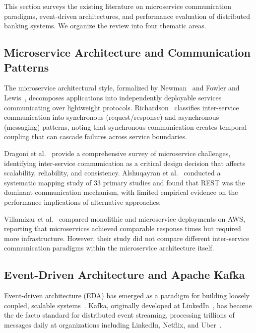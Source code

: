 \documentclass[journal]{IEEEtran}
\begin{document}
This section surveys the existing literature on microservice communication paradigms, event-driven architectures, and performance evaluation of distributed banking systems. We organize the review into four thematic areas.

\subsection{Microservice Architecture and Communication Patterns}
\label{subsec:rw_microservices}

The microservice architectural style, formalized by Newman~\cite{newman2015building} and Fowler and Lewis~\cite{fowler2014microservices}, decomposes applications into independently deployable services communicating over lightweight protocols. Richardson~\cite{richardson2018microservices} classifies inter-service communication into synchronous (request/response) and asynchronous (messaging) patterns, noting that synchronous communication creates temporal coupling that can cascade failures across service boundaries.

Dragoni et al.~\cite{dragoni2017microservices} provide a comprehensive survey of microservice challenges, identifying inter-service communication as a critical design decision that affects scalability, reliability, and consistency. Alshuqayran et al.~\cite{alshuqayran2016systematic} conducted a systematic mapping study of 33 primary studies and found that REST was the dominant communication mechanism, with limited empirical evidence on the performance implications of alternative approaches.

Villamizar et al.~\cite{villamizar2015infrastructure} compared monolithic and microservice deployments on AWS, reporting that microservices achieved comparable response times but required more infrastructure. However, their study did not compare different inter-service communication paradigms within the microservice architecture itself.

\subsection{Event-Driven Architecture and Apache Kafka}
\label{subsec:rw_kafka}

Event-driven architecture (EDA) has emerged as a paradigm for building loosely coupled, scalable systems~\cite{michelson2006event}. Kafka, originally developed at LinkedIn~\cite{kreps2011kafka}, has become the de facto standard for distributed event streaming, processing trillions of messages daily at organizations including LinkedIn, Netflix, and Uber~\cite{kafka_documentation}.
\end{document}

